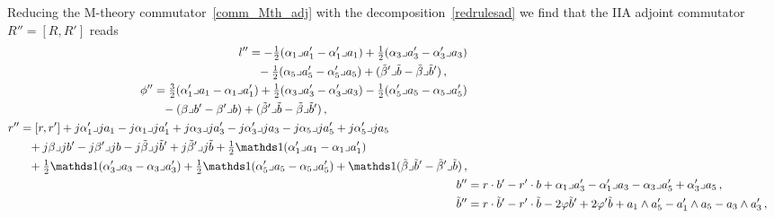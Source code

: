 \documentclass[debug]{phd}
\begin{document}
			Reducing the M-theory commutator~\eqref{comm_Mth_adj} with the decomposition~\eqref{redrulesad} we find that the IIA adjoint commutator $R'' = [R,R']$ reads 
				\begin{subequations}\label{eq:commAdjIIA}
					\begin{align}
								\begin{split}
									l'' &= -\tfrac{1}{2} (\alpha_1 \lrcorner a_1' - \alpha_1' \lrcorner a_1)+\tfrac{1}{2} (\alpha_3 \lrcorner a_3' - \alpha_3' \lrcorner a_3) \\
									&\phantom{=} - \tfrac{1}{2} (\alpha_5 \lrcorner a_5' - \alpha_5' \lrcorner a_5) + (\tilde \beta' \lrcorner \tilde b - \tilde \beta \lrcorner \tilde b') \, ,
								\end{split}
								\\
								\begin{split}
									\phi'' &= \tfrac{3}{2} (\alpha_1' \lrcorner a_1 - \alpha_1 \lrcorner a_1') + \tfrac{1}{2} (\alpha_3 \lrcorner a_3' - \alpha_3' \lrcorner a_3) - \tfrac{1}{2}(\alpha_5' \lrcorner a_5 - \alpha_5 \lrcorner a_5') \\
										&\phantom{=} - ( \beta \lrcorner b' - \beta' \lrcorner b) + (\tilde \beta' \lrcorner \tilde b - \tilde \beta \lrcorner \tilde b') \, ,
								\end{split}
							\\
								\begin{split}
									r'' 	&= [ r, r'] + j \alpha_1' \lrcorner j a_1 - j \alpha_1\lrcorner j a_1' + j\alpha_3 \lrcorner j a_3' - j\alpha_3' \lrcorner ja_3 - j\alpha_5 \lrcorner j a_5' +j \alpha_5' \lrcorner j a_5 \\ 
										&\phantom{=} + j \beta \lrcorner j b' - j \beta' \lrcorner j b - j \tilde \beta \lrcorner j \tilde b' + j \tilde \beta' \lrcorner j \tilde b + \tfrac{1}{2}\id (\alpha_1' \lrcorner a_1 - \alpha_1 \lrcorner a_1') \\
										&\phantom{=} + \tfrac{1}{2} \id (\alpha_3' \lrcorner a_3 - \alpha_3 \lrcorner a_3')+ \tfrac{1}{2} \id (\alpha_5' \lrcorner a_5 - \alpha_5 \lrcorner a_5') + \id(\tilde \beta \lrcorner \tilde b' - \tilde\beta' \lrcorner \tilde b) \, ,
								\end{split}
							\\
							b'' &= r \cdot b'- r' \cdot b +\alpha_1 \lrcorner a_3' - \alpha_1' \lrcorner a_3 - \alpha_3 \lrcorner a_5' + \alpha_3' \lrcorner a_5 \, , \\
							\tilde b'' &= r \cdot \tilde b' - r' \cdot \tilde b -2\varphi \tilde b' + 2\varphi'\tilde b + a_1 \wedge a_5' - a_1' \wedge a_5 - a_3 \wedge a_3' \, ,\\

\end{align}
\end{subequations}
\end{document}
